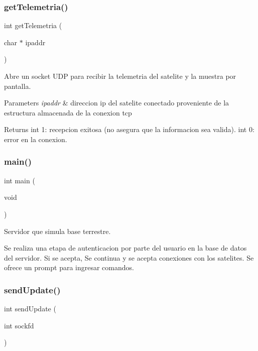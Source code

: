 \subsubsection{getTelemetria()}
{\footnotesize\ttfamily int get\+Telemetria (\begin{DoxyParamCaption}\item[{char $\ast$}]{ipaddr }\end{DoxyParamCaption})}



Abre un socket U\+DP para recibir la telemetria del satelite y la muestra por pantalla. 


\begin{DoxyParams}{Parameters}
{\em ipaddr} & direccion ip del satelite conectado proveniente de la estructura almacenada de la conexion tcp \\
\hline
\end{DoxyParams}
\begin{DoxyReturn}{Returns}
int 1\+: recepcion exitosa (no asegura que la informacion sea valida). int 0\+: error en la conexion. 
\end{DoxyReturn}
\mbox{\label{server_2main_8c_a840291bc02cba5474a4cb46a9b9566fe}} 
\subsubsection{main()}
{\footnotesize\ttfamily int main (\begin{DoxyParamCaption}\item[{void}]{ }\end{DoxyParamCaption})}



Servidor que simula base terrestre. 

Se realiza una etapa de autenticacion por parte del usuario en la base de datos del servidor. Si se acepta, Se continua y se acepta conexiones con los satelites. Se ofrece un prompt para ingresar comandos. \mbox{\label{server_2main_8c_a399ed36a71efbd160709be4b09406574}} 
\subsubsection{sendUpdate()}
{\footnotesize\ttfamily int send\+Update (\begin{DoxyParamCaption}\item[{int}]{sockfd }\end{DoxyParamCaption})}



